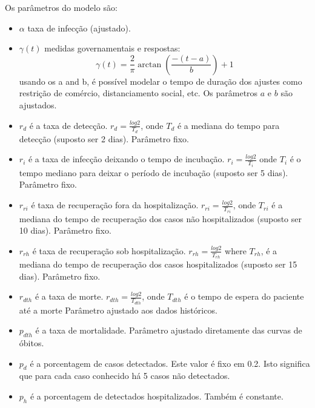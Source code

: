 \documentclass[12pt]{article}
\begin{document}
   Os parâmetros do modelo são:
   \begin{itemize}
    \item $\alpha$ taxa de infecção (ajustado).
    
    \item $\gamma(t)$ medidas governamentais e respostas:
   \[
     \gamma(t) = \frac{2}{\pi} \arctan \left( \frac{-(t - a)}{b}  \right) + 1
   \]
   usando os  a and b, é possível modelar o tempo de duração dos ajustes como restrição de comércio, distanciamento social, etc. Os parâmetros $a$ e $b$ são ajustados.
   
   \item $r_d$ é a taxa de detecção.   $ r_d = \frac{log 2}{T_d}$,
    onde $T_d$ é a mediana do tempo para detecção (suposto ser 2 dias). Parâmetro fixo.
   
   \item $r_i$ é a taxa de infecção deixando o tempo de incubação. 
     $r_i = \frac{log 2}{T_i}$  onde $T_i$ é o tempo mediano para deixar o período de incubação (suposto ser 5 dias).  Parâmetro fixo.
   
   \item $r_{ri}$ é taxa de recuperação fora da hospitalização. 
      $r_{ri} = \frac{log 2}{T_{ri}}$, onde $T_{ri}$ é a mediana do tempo de recuperação dos casos não hospitalizados (suposto ser 10 dias). Parâmetro fixo.
   
   \item $r_{rh}$ é taxa de recuperação sob hospitalização.
   $r_{rh} = \frac{log 2}{T_{rh}}$ where $T_{rh}$, é a mediana do tempo de recuperação dos casos  hospitalizados (suposto ser 15 dias). Parâmetro fixo.
   
   \item $r_{dth}$ é a taxa de morte.
    $r_{dth} = \frac{log 2}{T_{dth}}$, onde $T_{dth}$ é o tempo de espera do paciente até a morte  Parâmetro ajustado aos dados históricos.
   
   \item $p_{dth}$ é a taxa de mortalidade. Parâmetro ajustado diretamente das curvas de óbitos.
   
   \item $p_d$ é a porcentagem de casos detectados. Este valor é fixo em 0.2. Isto significa que para cada caso conhecido há 5 casos não detectados. 
   
   \item $p_h$ é a porcentagem de detectados hospitalizados. Também é constante. 
   
   \end{itemize}
\end{document}
